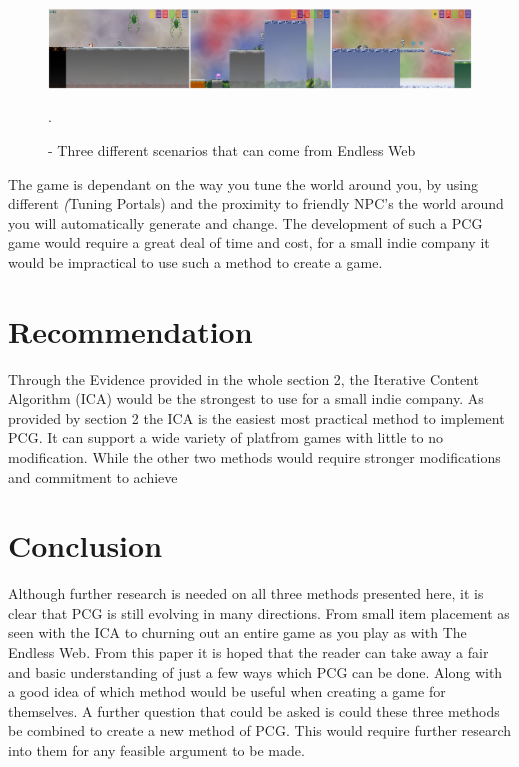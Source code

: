 \documentclass{scrartcl}
\begin{document}
\begin{figure}[h]
	\centering
	\includegraphics[width=0.7\linewidth]{Fig9}
	\caption{ - Three different scenarios that can come from Endless Web}.
	\label{Fig9}
\end{figure}\cite{web}

The game is dependant on the way you tune the world around you, by using different \textit(Tuning Portals) and the proximity to friendly NPC's the world around you will automatically generate and change\cite{web}. The development of such a PCG game would require a great deal of time and cost, for a small indie company it would be impractical to use such a method to create a game.

\section{Recommendation}

Through the Evidence provided in the whole section 2, the Iterative Content Algorithm (ICA) would be the strongest to use for a small indie company. As provided by section 2 the ICA is the easiest most practical method to implement PCG. It can support a wide variety of platfrom games with little to no modification\cite{fausto}. While the other two methods would require stronger modifications and commitment to achieve\cite{walaa,web}

\section{Conclusion}

Although further research is needed on all three methods presented here, it is clear that PCG is still evolving in many directions. From small item placement as seen with the ICA to churning out an entire game as you play as with The Endless Web. From this paper it is hoped that the reader can take away a fair and basic understanding of just a few ways which PCG can be done. Along with a good idea of which method would be useful when creating a game for themselves. A further question that could be asked is could these three methods be combined to create a new method of PCG. This would require further research into them for any feasible argument to be made.



\end{document}
